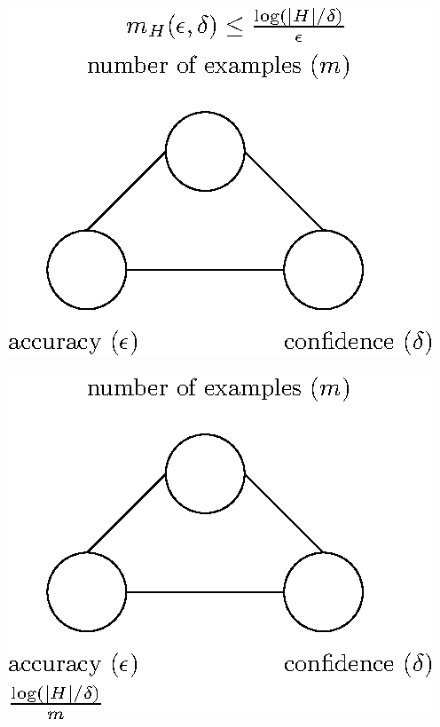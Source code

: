   \begin{figure}[h!]
 \centering\includegraphics[scale=0.8]{connection_m_eps_delta_finite4.eps}
  \end{figure}


  \begin{figure}[h!]
 \centering\includegraphics[scale=0.8]{connection_m_eps_delta_finite2.eps}
 \end{figure}


